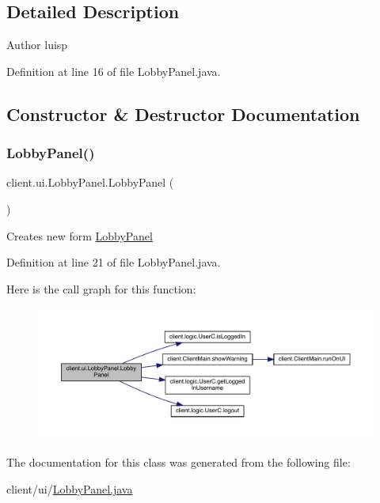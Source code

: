 \subsection{Detailed Description}
\begin{DoxyAuthor}{Author}
luisp 
\end{DoxyAuthor}


Definition at line 16 of file Lobby\+Panel.\+java.



\subsection{Constructor \& Destructor Documentation}
\hypertarget{classclient_1_1ui_1_1_lobby_panel_aa6432c40dfb52b11101ab3e1e7fbb30c}{}\label{classclient_1_1ui_1_1_lobby_panel_aa6432c40dfb52b11101ab3e1e7fbb30c} 
\subsubsection{\texorpdfstring{Lobby\+Panel()}{LobbyPanel()}}
{\footnotesize\ttfamily client.\+ui.\+Lobby\+Panel.\+Lobby\+Panel (\begin{DoxyParamCaption}{ }\end{DoxyParamCaption})}

Creates new form \hyperlink{classclient_1_1ui_1_1_lobby_panel}{Lobby\+Panel} 

Definition at line 21 of file Lobby\+Panel.\+java.

Here is the call graph for this function\+:
\nopagebreak
\begin{figure}[H]
\begin{center}
\leavevmode
\includegraphics[width=350pt]{classclient_1_1ui_1_1_lobby_panel_aa6432c40dfb52b11101ab3e1e7fbb30c_cgraph}
\end{center}
\end{figure}


The documentation for this class was generated from the following file\+:\begin{DoxyCompactItemize}
\item 
client/ui/\hyperlink{_lobby_panel_8java}{Lobby\+Panel.\+java}\end{DoxyCompactItemize}
